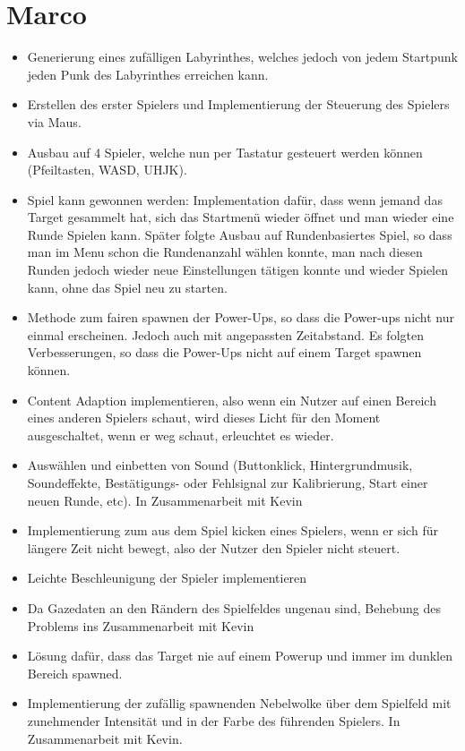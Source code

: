 \documentclass[10pt,a4paper]{article}
\begin{document}
	\section*{Marco}
		\begin{itemize}
			\item Generierung eines zuf\"alligen Labyrinthes, welches jedoch von jedem Startpunk jeden Punk des Labyrinthes erreichen kann.
			\item Erstellen des erster Spielers und Implementierung der Steuerung des Spielers via Maus.
			\item Ausbau auf 4 Spieler, welche nun per Tastatur gesteuert werden k\"onnen (Pfeiltasten, WASD, UHJK).
			\item Spiel kann gewonnen werden: Implementation daf\"ur, dass wenn jemand das Target gesammelt hat, sich das Startmen\"u wieder \"offnet und man wieder eine Runde Spielen kann. Sp\"ater folgte Ausbau auf Rundenbasiertes Spiel, so dass man im Menu schon die Rundenanzahl w\"ahlen konnte, man nach diesen Runden jedoch wieder neue Einstellungen t\"atigen konnte und wieder Spielen kann, ohne das Spiel neu zu starten.
			\item Methode zum fairen spawnen der Power-Ups, so dass die Power-ups nicht nur einmal erscheinen. Jedoch auch mit angepassten Zeitabstand. Es folgten Verbesserungen, so dass die Power-Ups nicht auf einem Target spawnen k\"onnen.
			\item Content Adaption implementieren, also wenn ein Nutzer auf einen Bereich eines anderen Spielers schaut, wird dieses Licht f\"ur den Moment ausgeschaltet, wenn er weg schaut, erleuchtet es wieder. 
			\item Ausw\"ahlen und einbetten von Sound (Buttonklick, Hintergrundmusik, Soundeffekte, Best\"atigungs- oder Fehlsignal zur Kalibrierung, Start einer neuen Runde, etc). In Zusammenarbeit mit Kevin
			\item Implementierung zum aus dem Spiel kicken eines Spielers, wenn er sich f\"ur l\"angere Zeit nicht bewegt, also der Nutzer den Spieler nicht steuert.
			\item Leichte Beschleunigung der Spieler implementieren
			\item Da Gazedaten an den R\"andern des Spielfeldes ungenau sind, Behebung des Problems ins Zusammenarbeit mit Kevin
			\item L\"osung daf\"ur, dass das Target nie auf einem Powerup und immer im dunklen Bereich spawned.
			\item Implementierung der zuf\"allig spawnenden Nebelwolke \"uber dem Spielfeld mit zunehmender Intensit\"at und in der Farbe des f\"uhrenden Spielers. In Zusammenarbeit mit Kevin.
		\end{itemize}
\end{document}

